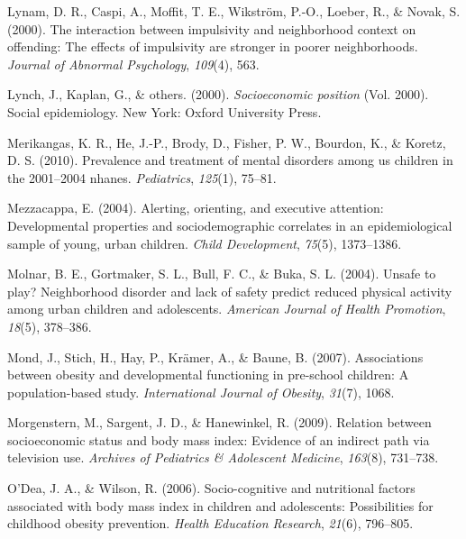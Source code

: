 \documentclass[man]{apa6}
\begin{document}
\leavevmode\hypertarget{ref-lynam2000interaction}{}%
Lynam, D. R., Caspi, A., Moffit, T. E., Wikström, P.-O., Loeber, R., \& Novak, S. (2000). The interaction between impulsivity and neighborhood context on offending: The effects of impulsivity are stronger in poorer neighborhoods. \emph{Journal of Abnormal Psychology}, \emph{109}(4), 563.

\leavevmode\hypertarget{ref-lynch2000socioeconomic}{}%
Lynch, J., Kaplan, G., \& others. (2000). \emph{Socioeconomic position} (Vol. 2000). Social epidemiology. New York: Oxford University Press.

\leavevmode\hypertarget{ref-merikangas2010prevalence}{}%
Merikangas, K. R., He, J.-P., Brody, D., Fisher, P. W., Bourdon, K., \& Koretz, D. S. (2010). Prevalence and treatment of mental disorders among us children in the 2001--2004 nhanes. \emph{Pediatrics}, \emph{125}(1), 75--81.

\leavevmode\hypertarget{ref-mezzacappa2004alerting}{}%
Mezzacappa, E. (2004). Alerting, orienting, and executive attention: Developmental properties and sociodemographic correlates in an epidemiological sample of young, urban children. \emph{Child Development}, \emph{75}(5), 1373--1386.

\leavevmode\hypertarget{ref-molnar2004unsafe}{}%
Molnar, B. E., Gortmaker, S. L., Bull, F. C., \& Buka, S. L. (2004). Unsafe to play? Neighborhood disorder and lack of safety predict reduced physical activity among urban children and adolescents. \emph{American Journal of Health Promotion}, \emph{18}(5), 378--386.

\leavevmode\hypertarget{ref-mond2007associations}{}%
Mond, J., Stich, H., Hay, P., Krämer, A., \& Baune, B. (2007). Associations between obesity and developmental functioning in pre-school children: A population-based study. \emph{International Journal of Obesity}, \emph{31}(7), 1068.

\leavevmode\hypertarget{ref-morgenstern2009relation}{}%
Morgenstern, M., Sargent, J. D., \& Hanewinkel, R. (2009). Relation between socioeconomic status and body mass index: Evidence of an indirect path via television use. \emph{Archives of Pediatrics \& Adolescent Medicine}, \emph{163}(8), 731--738.

\leavevmode\hypertarget{ref-o2006socio}{}%
O'Dea, J. A., \& Wilson, R. (2006). Socio-cognitive and nutritional factors associated with body mass index in children and adolescents: Possibilities for childhood obesity prevention. \emph{Health Education Research}, \emph{21}(6), 796--805.
\end{document}

